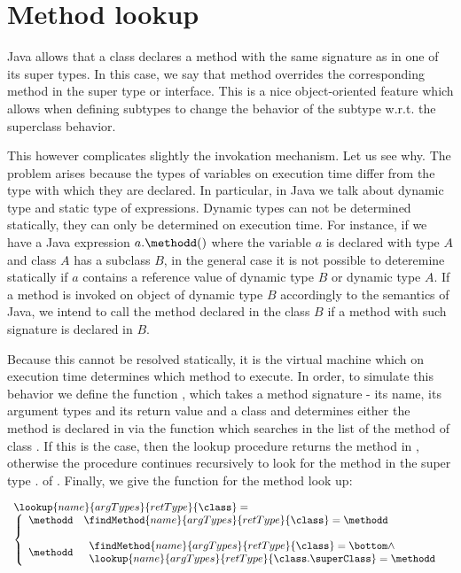 \index{\lookupOnly}
\section{Method lookup}

Java allows that a class   declares a method \methodd{} with the same signature as in one of its super types.
In this case, we say that method \methodd{}  overrides the corresponding method in the super type or interface.
This is a nice object-oriented feature which allows when defining subtypes to change the behavior of the subtype
 w.r.t. the superclass behavior.

This however complicates slightly the invokation mechanism. Let us see why.
 The problem arises because the types of variables  on execution time differ from the type 
with which they are declared. In particular, in Java we talk about  dynamic type and static type of expressions.
Dynamic types can not be determined statically, they can only be determined on execution time.
For instance, if we have a Java expression 
$a.\methodd()$ where  the variable $a$ is declared with type $A$ and class $A$ has a subclass $B$,
 in the general case it is not possible  to deteremine statically if $a$ contains 
a reference value of dynamic type $B$ or dynamic type $A$.
 If a method  \methodd{} is invoked on object of dynamic type $B$
accordingly to the semantics of Java, we intend to call the method declared in the class $B$ if a method with such signature is declared in $B$.


Because this cannot be resolved statically,  it is the virtual machine which on execution time determines which method to execute. 
 In order, to simulate this behavior we define the function \lookupOnly, which takes a method signature - its name, its argument types and its return value
 and a class \class{} and determines either the method is declared
in \class{} via the function \findMethodOnly{} which searches in the list of the method of class \class. If this is the case, then the lookup procedure returns the method in \class, otherwise the procedure continues recursively
to look for the method in the super type \class.\superClass{} of \class. Finally, we give the function for the method look up:

$$\begin{array}{l}
\lookup{name}{ argTypes}{retType }{\class} = \\
       \left\{\begin{array}{ll}
             \methodd & \findMethod{name}{ argTypes} {retType}{\class} = \methodd \\
	              & \\
	     \methodd &    \begin{array}{l}
                                  \findMethod{name}{ argTypes} {retType}{\class} = \bottom \wedge \\
				  \lookup{name}{ argTypes} {retType}{\class.\superClass} = \methodd
			\end{array}	  
       \end{array}\right.
\end{array}$$
